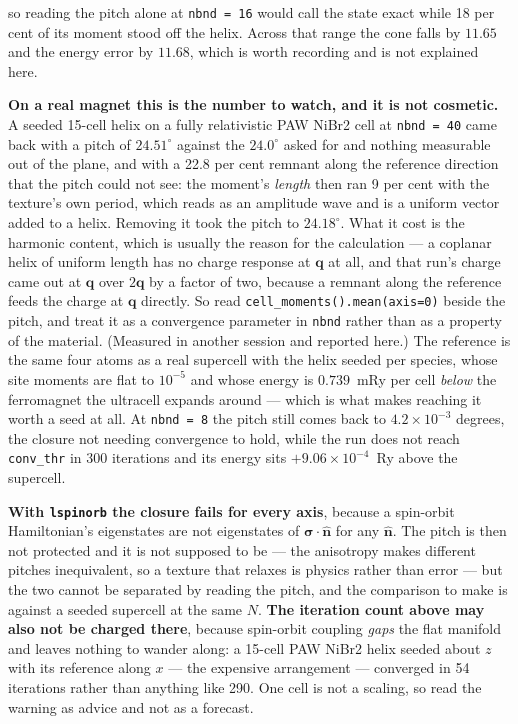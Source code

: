 \documentclass[11pt,a4paper]{article}
\newcommand{\code}[1]{\texttt{\small #1}}
\begin{document}
so reading the pitch alone at \code{nbnd = 16} would call the state exact while
18 per cent of its moment stood off the helix. Across that range the cone falls
by $11.65$ and the energy error by $11.68$, which is worth recording and is not
explained here.

\textbf{On a real magnet this is the number to watch, and it is not cosmetic.} A
seeded 15-cell helix on a fully relativistic PAW NiBr2 cell at \code{nbnd = 40}
came back with a pitch of $24.51^\circ$ against the $24.0^\circ$ asked for and
nothing measurable out of the plane, and with a 22.8 per cent remnant along the
reference direction that the pitch could not see: the moment's \emph{length} then
ran 9 per cent with the texture's own period, which reads as an amplitude wave and
is a uniform vector added to a helix. Removing it took the pitch to
$24.18^\circ$. What it cost is the harmonic content, which is usually the reason
for the calculation --- a coplanar helix of uniform length has no charge response
at $\mathbf q$ at all, and that run's charge came out at $\mathbf q$ over
$2\mathbf q$ by a factor of two, because a remnant along the reference feeds the
charge at $\mathbf q$ directly. So read \code{cell\_moments().mean(axis=0)} beside
the pitch, and treat it as a convergence parameter in \code{nbnd} rather than as
a property of the material. (Measured in another session and reported here.) The reference is the same four
atoms as a real supercell with the helix seeded per species, whose site moments
are flat to $10^{-5}$ and whose energy is $0.739$~mRy per cell \emph{below} the
ferromagnet the ultracell expands around --- which is what makes reaching it
worth a seed at all. At \code{nbnd = 8} the pitch still comes back to
$4.2\times10^{-3}$ degrees, the closure not needing convergence to hold, while
the run does not reach \code{conv\_thr} in 300 iterations and its energy sits
$+9.06\times10^{-4}$~Ry above the supercell.

\textbf{With \code{lspinorb} the closure fails for every axis}, because a
spin-orbit Hamiltonian's eigenstates are not eigenstates of
$\boldsymbol\sigma\cdot\hat{\mathbf n}$ for any $\hat{\mathbf n}$. The pitch is
then not protected and it is not supposed to be --- the anisotropy makes
different pitches inequivalent, so a texture that relaxes is physics rather than
error --- but the two cannot be separated by reading the pitch, and the
comparison to make is against a seeded supercell at the same $N$. \textbf{The
iteration count above may also not be charged there}, because spin-orbit coupling
\emph{gaps} the flat manifold and leaves nothing to wander along: a 15-cell PAW
NiBr2 helix seeded about $z$ with its reference along $x$ --- the expensive
arrangement --- converged in 54 iterations rather than anything like 290. One cell
is not a scaling, so read the warning as advice and not as a forecast.
\end{document}
